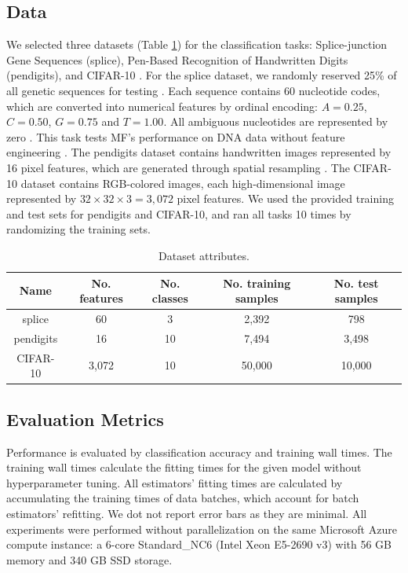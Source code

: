 \subsection{Data}
We selected three datasets (Table \ref{table:data}) for the classification tasks: Splice-junction Gene Sequences (splice), Pen-Based Recognition of Handwritten Digits (pendigits), and CIFAR-10 \citep{splice, pendigits, cifar}. 
For the splice dataset, we randomly reserved 25\% of all genetic sequences for testing \citep{Rampone1998, Sarkar2020splice}. Each sequence contains 60 nucleotide codes, which are converted into numerical features by ordinal encoding: $A = 0.25$, $C = 0.50$, $G = 0.75$ and $T = 1.00$. All ambiguous nucleotides are represented by zero \citep{choong2017evaluation}. This task tests MF's performance on DNA data without feature engineering \citep{mondrian}. 
The pendigits dataset contains handwritten images represented by 16 pixel features, which are generated through spatial resampling \citep{Alimoglu96methodsof}.
The CIFAR-10 dataset contains RGB-colored images, each high-dimensional image represented by $32 \times 32 \times 3 = 3,072$ pixel features. We used the provided training and test sets for pendigits and CIFAR-10, and ran all tasks 10 times by randomizing the training sets. 

\begin{table}[htb]
\centering
\begin{tabular}{ |c|c|c|c|c| } 
\hline
Name & No. features & No. classes & No. training samples & No. test samples \\
\hline
splice & 60 & 3 & 2,392 & 798 \\
\hline
pendigits & 16 & 10 & 7,494 & 3,498 \\
\hline
CIFAR-10 & 3,072 & 10 & 50,000 & 10,000 \\
\hline
\end{tabular}
\caption{Dataset attributes.}
\label{table:data}
\end{table}

\subsection{Evaluation Metrics}
Performance is evaluated by classification accuracy and training wall times. 
The training wall times calculate the fitting times for the given model without hyperparameter tuning. All estimators' fitting times are calculated by accumulating the training times of data batches, which account for batch estimators' refitting. We dot not report error bars as they are minimal.
All experiments were performed without parallelization on the same Microsoft Azure compute instance: a 6-core Standard\_NC6 (Intel Xeon E5-2690 v3) with 56 GB memory and 340 GB SSD storage.
